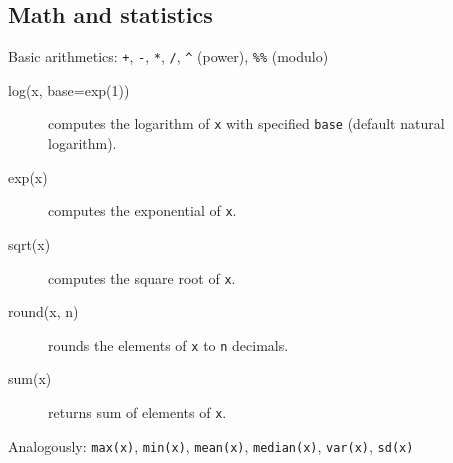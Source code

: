 \documentclass[a4paper,9pt]{extarticle}
\begin{document}
\begin{multicols}{3}
\section{Math and statistics}
\noindent
Basic arithmetics: \texttt{+}, \texttt{-}, \texttt{*}, \texttt{/}, \texttt{\^} (power), \texttt{\%\%} (modulo)
\begin{description}
\item[log(x, base=exp(1))] computes the logarithm of \texttt{x} with specified \texttt{base} (default natural logarithm).
\item[exp(x)] computes the exponential of \texttt{x}.
\item[sqrt(x)] computes the square root of \texttt{x}.
\item[round(x, n)] rounds the elements of \texttt{x} to \texttt{n} decimals.
\item[sum(x)] returns sum of elements of \texttt{x}.
\end{description}
\noindent
Analogously: \texttt{max(x)}, \texttt{min(x)}, \texttt{mean(x)}, \texttt{median(x)}, \texttt{var(x)}, \texttt{sd(x)}


\end{multicols}
\end{document}
